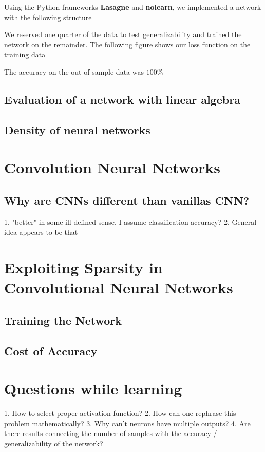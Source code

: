 \documentclass[12pt,letterpaper,boxed]{article}
\begin{document}
Using the Python frameworks \textbf{Lasagne} and \textbf{nolearn}, we implemented a network with the following structure


We reserved one quarter of the data to test generalizability and trained the network on the remainder. The following figure shows our loss function on the training data


The accuracy on the out of sample data was $100\%$

\subsection{Evaluation of a network with linear algebra}

\subsection{Density of neural networks}

\section{Convolution Neural Networks}

\subsection{Why are CNNs different than vanillas CNN?}
1. "better" in some ill-defined sense. I assume classification accuracy?
2. General idea appears to be that

\section{Exploiting Sparsity in Convolutional Neural Networks}

	\subsection{Training the Network}

	\subsection{Cost of Accuracy}

\section{Questions while learning}
1. How to select proper activation function?
2. How can one rephrase this problem mathematically?
3. Why can't neurons have multiple outputs?
4. Are there results connecting the number of samples with the accuracy / generalizability of the network?
\end{document}
